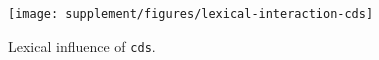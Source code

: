\begin{wrapfigure}{O}{0.5\textwidth}
  \centering

  \texttt{[image: supplement/figures/lexical-interaction-cds]}

  \caption{Lexical influence of \texttt{cds}.}
  \label{fig:lexical-cds}
\end{wrapfigure}
